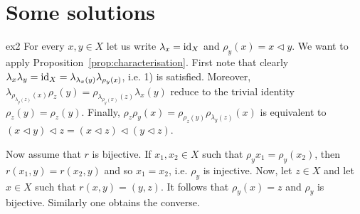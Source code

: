 \section*{Some solutions}

\fancyhf{}
\fancyfoot[R]{\thepage}
\fancyhead[L]{\course}
\setlength{\headheight}{14pt}


\begin{sol}{ex2}
    For every $x,y \in X$ let us write $\lambda_x = \operatorname{id}_X$ and $\rho_y(x)=x \triangleleft y$.
    We want to apply Proposition~\ref{prop:characterisation}.
    First note that clearly $\lambda_x\lambda_y =\operatorname{id}_X = \lambda_{\lambda_x(y)}\lambda_{\rho_y(x)}$, i.e. 1) is satisfied. 
    Moreover,$\lambda_{\rho_{\lambda_y(z)}(x)}\rho_z(y)=\rho_{\lambda_{\rho_y(x)}(z)}\lambda_x(y)$ reduce to the trivial identity $\rho_z(y)=\rho_{z}(y)$.
    Finally,  $\rho_z\rho_y(x)=\rho_{\rho_z(y)}\rho_{\lambda_y(z)}(x)$ is equivalent to $(x\triangleleft y)\triangleleft z=(x\triangleleft z)\triangleleft(y\triangleleft z)$.

    Now assume that $r$ is bijective. If $x_1,x_2\in X$ such that $\rho_y{x_1}=\rho_y(x_2)$, then $r(x_1,y)=r(x_2,y)$ and so $x_1=x_2$, i.e. $\rho_y$ is injective. Now, let $z \in X$ and let $x\in X$ such that $r(x,y) =(y,z)$. It follows that $\rho_y(x)=z$ and $\rho_y$ is bijective. 
    Similarly one obtains the converse. 
\end{sol}

